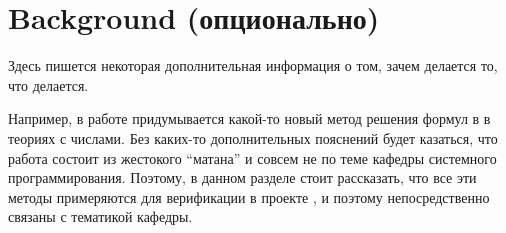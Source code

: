 
\section{Background (опционально)}
Здесь пишется некоторая дополнительная информация о том, зачем делается то, что делается.

Например, в работе придумывается какой-то новый метод решения формул в \SMT{} в теориях с числами. Без каких-то дополнительных пояснений будет казаться, что работа состоит из жестокого \enquote{матана} и совсем не по теме кафедры системного программирования.
Поэтому, в данном разделе стоит рассказать, что все эти методы примеряются для верификации в проекте \vsharp{}, и поэтому непосредственно связаны с тематикой кафедры.
